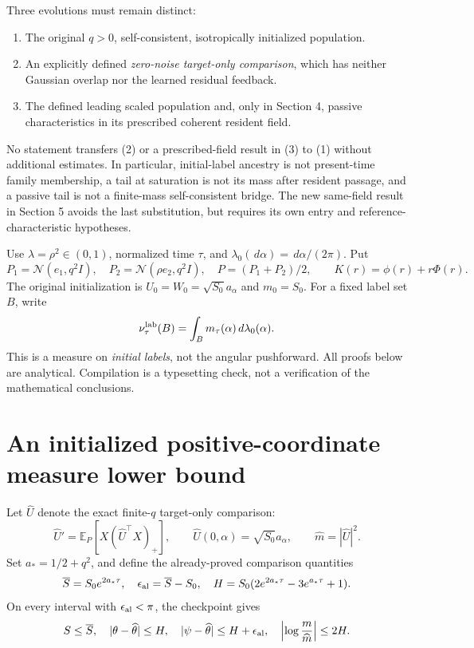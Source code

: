 \documentclass[11pt]{article}
\numberwithin{equation}{section}
\theoremstyle{remark}\newtheorem{remark}[theorem]{Remark}
\newcommand{\E}{\mathbb E}
\newcommand{\dd}{\,d}
\newcommand{\1}{\mathbf 1}
\begin{document}
Three evolutions must remain distinct:
\begin{enumerate}
\item The original $q>0$, self-consistent, isotropically initialized population.
\item An explicitly defined \emph{zero-noise target-only comparison}, which
has neither Gaussian overlap nor the learned residual feedback.
\item The defined leading scaled population and, only in Section 4, passive
characteristics in its prescribed coherent resident field.
\end{enumerate}
No statement transfers (2) or a prescribed-field result in (3) to (1)
without additional estimates. In particular, initial-label ancestry is not
present-time family membership, a tail at saturation is not its mass after
resident passage, and a passive tail is not a finite-mass self-consistent
bridge. The new same-field result in Section 5 avoids the last substitution,
but requires its own entry and reference-characteristic hypotheses.

Use $\lambda=\rho^2\in(0,1)$, normalized time $\tau$, and
$\lambda_0(\dd\alpha)=\dd\alpha/(2\pi)$. Put
\[
 P_1=\mathcal N(e_1,q^2 I),\quad P_2=\mathcal N(\rho e_2,q^2I),\quad
 P=(P_1+P_2)/2,\qquad
 K(r)=\phi(r)+r\Phi(r).
\]
The original initialization is $U_0=W_0=\sqrt{S_0}a_\alpha$ and $m_0=S_0$.
For a fixed label set $B$, write
\[
 \nu_\tau^{\rm lab}(B)=\int_Bm_\tau(\alpha)\dd\lambda_0(\alpha).
\]
This is a measure on \emph{initial labels}, not the angular pushforward.
All proofs below are analytical. Compilation is a typesetting check, not
a verification of the mathematical conclusions.

\section{An initialized positive-coordinate measure lower bound}
\label{inc:AN02:tail:v1:ancestry}
Let $\widehat U$ denote the exact finite-$q$ target-only comparison:
\begin{equation}\label{inc:AN02:tail:v1:target}
 \widehat U'=\E_P[X(\widehat U^\top X)_+],\qquad
 \widehat U(0,\alpha)=\sqrt{S_0}a_\alpha,\qquad
 \widehat m=|\widehat U|^2.
\end{equation}
Set $a_*=1/2+q^2$, and define the already-proved comparison quantities
\begin{equation}\label{inc:AN02:tail:v1:comparison}
 \overline S=S_0e^{2a_*\tau},\quad
 \epsilon_{\rm al}=\overline S-S_0,\quad
 H=S_0(2e^{2a_*\tau}-3e^{a_*\tau}+1).
\end{equation}
On every interval with $\epsilon_{\rm al}<\pi$, the checkpoint gives
\begin{equation}\label{inc:AN02:tail:v1:masscomparison}
 S\le\overline S,\quad
 |\theta-\widehat\theta|\le H,\quad
 |\psi-\widehat\theta|\le H+\epsilon_{\rm al},\quad
 \left|\log\frac{m}{\widehat m}\right|\le2H.
\end{equation}
\end{document}
